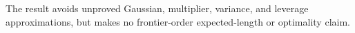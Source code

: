 The result avoids unproved Gaussian, multiplier, variance, and leverage approximations, but makes no frontier-order expected-length or optimality claim.